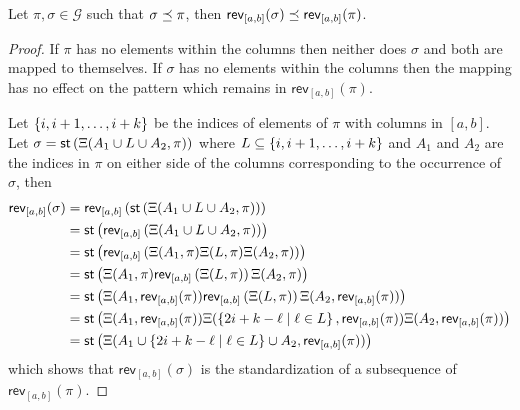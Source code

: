 \begin{lemma}\label{lem:crevcontain}
Let $\pi, \sigma \in \mathcal{G}$ such that $\sigma \preceq \pi$, then $\textsf{rev}_{[a,b]}(\sigma) \preceq \textsf{rev}_{[a,b]}(\pi)$.
\end{lemma}
\begin{proof}
If $\pi$ has no elements within the columns then neither does $\sigma$ and both are mapped to themselves. If $\sigma$ has no elements within the columns then the mapping has no effect on the pattern which remains in $\textsf{rev}_{[a,b]}(\pi)$. 

Let $\left\{i,i+1,\dotsc,i+k\right\}$ be the indices of elements of $\pi$ with columns in $[a,b]$. Let $\sigma = \textsf{st}\left(\Xi(A_1\cup L \cup A_2,\pi)\right)$ where $L \subseteq \left\{i,i+1,\dotsc,i+k\right\}$ and $A_1$ and $A_2$ are the indices in $\pi$ on either side of the columns corresponding to the occurrence of $\sigma$, then
\begin{align*}
    \textsf{rev}_{[a,b]}(\sigma) &= \textsf{rev}_{[a,b]}\left(\textsf{st}\left(\Xi(A_1\cup L \cup A_2,\pi)\right)\right)\\ 
    &= \textsf{st}\left(\textsf{rev}_{[a,b]}\left(\Xi(A_1\cup L \cup A_2,\pi)\right)\right)\\
    &= \textsf{st}\left(\textsf{rev}_{[a,b]}\left(\Xi(A_1,\pi)\Xi(L,\pi)\Xi(A_2,\pi)\right)\right)\\
    &= \textsf{st}\left(\Xi(A_1,\pi)\textsf{rev}_{[a,b]}\left(\Xi(L,\pi)\right)\Xi(A_2,\pi)\right) \\
    &= \textsf{st}\left(\Xi(A_1,\textsf{rev}_{[a,b]}(\pi))\textsf{rev}_{[a,b]}\left(\Xi(L,\pi)\right)\Xi(A_2,\textsf{rev}_{[a,b]}(\pi))\right) \\
    &= \textsf{st}\left(\Xi(A_1,\textsf{rev}_{[a,b]}(\pi))\Xi(\left\{2i+k-\ell \mid \ell \in L\right\},\textsf{rev}_{[a,b]}(\pi))\Xi(A_2,\textsf{rev}_{[a,b]}(\pi))\right)\\
    &= \textsf{st}\left(\Xi(A_1 \cup \left\{2i+k-\ell \mid \ell \in L\right\} \cup A_2,\textsf{rev}_{[a,b]}(\pi))\right)
\end{align*}
which shows that $\textsf{rev}_{[a,b]}(\sigma)$ is the standardization of a subsequence of $\textsf{rev}_{[a,b]}(\pi)$.
\end{proof}

